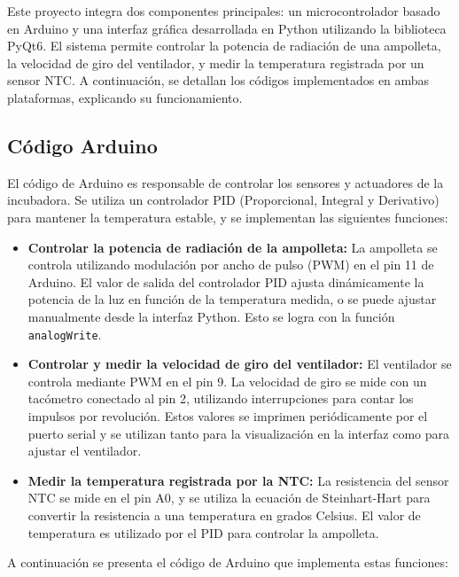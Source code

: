 \documentclass[spanish, a4paper, 11pt]{article}
\begin{document}
Este proyecto integra dos componentes principales: un microcontrolador basado en Arduino y una interfaz gráfica desarrollada en Python utilizando la biblioteca PyQt6. El sistema permite controlar la potencia de radiación de una ampolleta, la velocidad de giro del ventilador, y medir la temperatura registrada por un sensor NTC. A continuación, se detallan los códigos implementados en ambas plataformas, explicando su funcionamiento.

\subsection{Código Arduino}

El código de Arduino es responsable de controlar los sensores y actuadores de la incubadora. Se utiliza un controlador PID (Proporcional, Integral y Derivativo) para mantener la temperatura estable, y se implementan las siguientes funciones:

\begin{itemize}
    \item {\bf Controlar la potencia de radiación de la ampolleta:} La ampolleta se controla utilizando modulación por ancho de pulso (PWM) en el pin 11 de Arduino. El valor de salida del controlador PID ajusta dinámicamente la potencia de la luz en función de la temperatura medida, o se puede ajustar manualmente desde la interfaz Python. Esto se logra con la función \texttt{analogWrite}.

    \item {\bf Controlar y medir la velocidad de giro del ventilador:} El ventilador se controla mediante PWM en el pin 9. La velocidad de giro se mide con un tacómetro conectado al pin 2, utilizando interrupciones para contar los impulsos por revolución. Estos valores se imprimen periódicamente por el puerto serial y se utilizan tanto para la visualización en la interfaz como para ajustar el ventilador.

    \item {\bf Medir la temperatura registrada por la NTC:} La resistencia del sensor NTC se mide en el pin A0, y se utiliza la ecuación de Steinhart-Hart para convertir la resistencia a una temperatura en grados Celsius. El valor de temperatura es utilizado por el PID para controlar la ampolleta.

\end{itemize}

A continuación se presenta el código de Arduino que implementa estas funciones:
\end{document}
